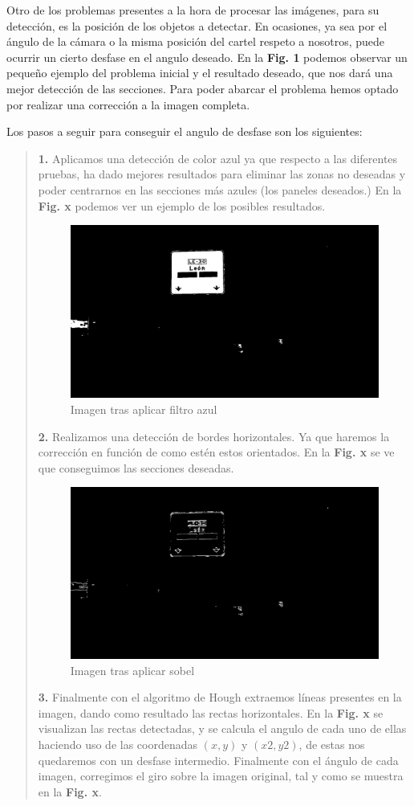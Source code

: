 \documentclass[a4paper, 12pt]{article}
\begin{document}
Otro de los problemas presentes a la hora de procesar las imágenes, para su detección, es la posición de los objetos a detectar. En ocasiones, ya sea por el ángulo de la cámara o la misma posición del cartel respeto a nosotros, puede ocurrir un cierto desfase en el angulo deseado. En la \textbf{Fig. 1} podemos observar un pequeño ejemplo del problema inicial y el resultado deseado, que nos dará una mejor detección de las secciones. Para poder abarcar el problema hemos optado por realizar una corrección a la imagen completa. 

Los pasos a seguir para conseguir el angulo de desfase son los siguientes:



\begin{quote}
	\textbf{1.} Aplicamos una detección de color azul ya que respecto a las diferentes pruebas, ha dado mejores resultados para eliminar las zonas no deseadas y poder centrarnos en las secciones más azules (los paneles deseados.) En la \textbf{Fig. x} podemos ver un ejemplo de los posibles resultados.
	\begin{figure}[h]
		\centering
		\includegraphics[width=0.6\linewidth]{img/image_blue_f}
		\caption{Imagen tras aplicar filtro azul}
		\label{fig:imagebluef}
	\end{figure}
	
	\textbf{2.} Realizamos una detección de bordes horizontales. Ya que haremos la corrección en función de como estén estos orientados. En la \textbf{Fig. x} se ve que conseguimos las secciones deseadas.
	
	\begin{figure}[h]
		\centering
		\includegraphics[width=0.6\linewidth]{img/image_boder_h}
		\caption{Imagen tras aplicar sobel}
		\label{fig:imageboderh}
	\end{figure}
	\textbf{3.} Finalmente con el algoritmo de Hough extraemos líneas presentes en la imagen, dando como resultado las rectas horizontales. En la \textbf{Fig. x} se visualizan las rectas detectadas, y se calcula el angulo de cada uno de ellas haciendo uso de las coordenadas $(x, y)$ y $(x2, y2)$, de estas nos quedaremos con un desfase intermedio. Finalmente con el ángulo de cada imagen, corregimos el giro sobre la imagen original, tal y como se muestra en la \textbf{Fig. x}.
	

\end{quote}
\end{document}

